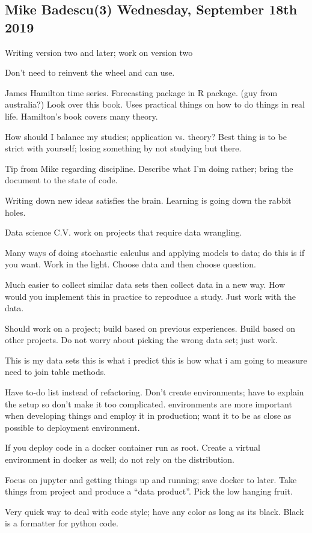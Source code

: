 \subsection{Mike Badescu(3) Wednesday, September 18th 2019}

Writing version two and later; work on version two

Don't need to reinvent the wheel and can use.

James Hamilton time series. Forecasting package in R package.
(guy from australia?) Look over this book. Uses practical
things on how to do things in real life. Hamilton's book
covers many theory.

How should I balance my studies; application vs. theory?
Best thing is to be strict with yourself; losing something
by not studying but there.

Tip from Mike regarding discipline. Describe
what I'm doing rather; bring the document to the
state of code.

Writing down new ideas satisfies the brain.
Learning is going down the rabbit holes.


Data science C.V. work on projects that require
data wrangling.

Many ways of doing stochastic calculus and applying
models to data; do this is if you want.
Work in the light. Choose data and then choose question.

Much easier to collect similar data sets then collect data
in a new way. How would you implement this in practice
to reproduce a study. Just work with the data.

Should work on a project; build based on previous experiences.
Build based on other projects. Do not worry about picking
the wrong data set; just work.

This is my data sets
this is what i predict
this is how what i am going to measure
need to join table
methods.

Have to-do list instead of refactoring. Don't create
environments; have to explain the setup so don't make
it too complicated. environments are more important when
developing things and employ it in production; want it
to be as close as possible to deployment environment.

If you deploy code in a docker container run as root.
Create a virtual environment in docker as well; do not
rely on the distribution.

Focus on jupyter and getting things up and running;
save docker to later. Take things from project and
produce a ``data product''. Pick the low hanging fruit.

Very quick way to deal with code style; have any color
as long as its black. Black is a formatter for python code.
